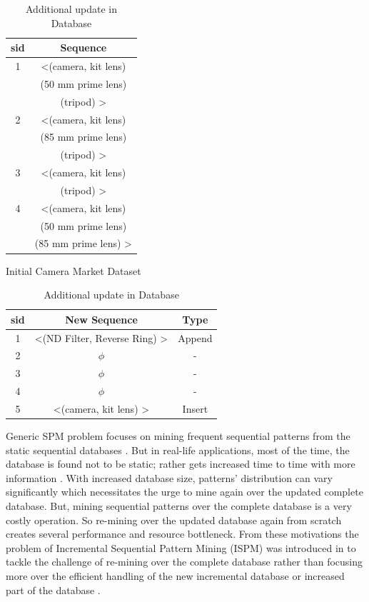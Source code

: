 \begin{table}[!t]
\parbox{.5\linewidth}{
\centering
\begin{tabular}{|c|c|}
\hline
sid & Sequence\\
\hline
1 & \textless (camera, kit lens) \\
& (50 mm prime lens)   \\
& (tripod) \textgreater\\
\hline
2 & \textless (camera, kit lens)   \\
& (85 mm prime lens) \\
& (tripod) \textgreater \\
\hline
3 & \textless (camera, kit lens)\\
& (tripod) \textgreater \\
\hline
4 & \textless (camera, kit lens) \\
& (50 mm prime lens) \\
& (85 mm prime lens) \textgreater \\
\hline
\end{tabular}
\caption{Initial Camera Market Dataset} \label{table:example_static_database}
}
\hfill
\parbox{.5\linewidth}{
\centering
\begin{tabular}{|c|c|c|}
\hline
sid & New Sequence & Type\\
\hline
1 & \textless (ND Filter, Reverse Ring) \textgreater & Append\\
\hline
2 & $\phi$ & - \\
\hline
3 & $\phi$ & - \\
\hline
4  & $\phi$ & - \\
\hline
5 & \textless (camera, kit lens) \textgreater & Insert\\
\hline
\end{tabular}
\caption{Additional update in Database} \label{table:example_incremental_database}
}
\end{table}

Generic SPM problem focuses on mining frequent sequential patterns from the static sequential databases
\cite{rizvee2020tree,srikant1996mining,zaki2001spade,han2001prefixspan,fournier2014fast,chen2009updown,perera2008clustering,okolica2018sequence,guidotti2018personalized}. But in real-life applications, most of the time, the database is found not to be static; rather gets increased time to time with more information \cite{mallick2013incremental}. With increased database size, patterns' distribution can vary significantly which necessitates the urge to mine again over the updated complete database. But, mining sequential patterns over the complete database is a very costly operation. So re-mining over the updated database again from scratch creates several performance and resource bottleneck. From these motivations the problem of Incremental Sequential Pattern Mining (ISPM) was introduced in \cite{wang1997discovering} to tackle the challenge of re-mining over the complete database rather than focusing more over the efficient handling of the new incremental database or increased part of the database \cite{mallick2013incremental,slimani2013sequential,fournier2017survey,huang2008general}.

